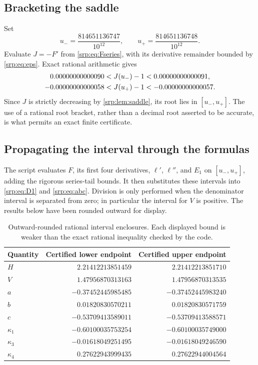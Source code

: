 \documentclass[11pt,a4paper]{article}
\numberwithin{equation}{section}
\theoremstyle{definition}
\theoremstyle{remark}
\begin{document}
\subsection{Bracketing the saddle}
Set
\begin{equation}
 u_- =\frac{814651136747}{10^{12}},\qquad
 u_+ =\frac{814651136748}{10^{12}}.
 \label{srp:eq:ubracket}
\end{equation}
Evaluate $J=-F'$ from \eqref{srp:eq:Fseries}, with its derivative remainder
bounded by \eqref{srp:eq:eps}. Exact rational arithmetic gives
\begin{align}
 0.00000000000090&<J(u_-)-1<0.00000000000091,\notag\\
 -0.00000000000058&<J(u_+)-1<-0.00000000000057.
 \label{srp:eq:Jbracket}
\end{align}
Since $J$ is strictly decreasing by \cref{srp:lem:saddle}, its root lies in
$[u_-,u_+]$. The use of a rational root bracket, rather than a decimal
root asserted to be accurate, is what permits an exact finite
certificate.

\subsection{Propagating the interval through the formulas}
The script evaluates $F$, its first four derivatives, $\ell'$,
$\ell''$, and $E_1$ on $[u_-,u_+]$, adding the rigorous series-tail
bounds. It then substitutes these intervals into \eqref{srp:eq:D1} and
\eqref{srp:eq:abc}. Division is only performed when the denominator
interval is separated from zero; in particular the interval for $V$ is
positive. The results below have been rounded outward for display.
\begin{table}[htbp]
\centering\small
\begin{tabular}{l r r}
\toprule
Quantity & Certified lower endpoint & Certified upper endpoint\\
\midrule
$H$ & $2.21412213851459$ & $2.21412213851710$\\
$V$ & $1.47956870313163$ & $1.47956870313535$\\
$a$ & $-0.37452445985485$ & $-0.37452445983240$\\
$b$ & $0.01820830570211$ & $0.01820830571759$\\
$c$ & $-0.53709413589011$ & $-0.53709413588571$\\
$\kappa_1$ & $-0.60100035753254$ & $-0.60100035749000$\\
$\kappa_3$ & $-0.01618049251495$ & $-0.01618049246590$\\
$\kappa_4$ & $0.27622943999435$ & $0.27622944004564$\\
\bottomrule
\end{tabular}
\caption{Outward-rounded rational interval enclosures. Each displayed
bound is weaker than the exact rational inequality checked by the code.}
\label{srp:tab:certificate}
\end{table}
\end{document}
